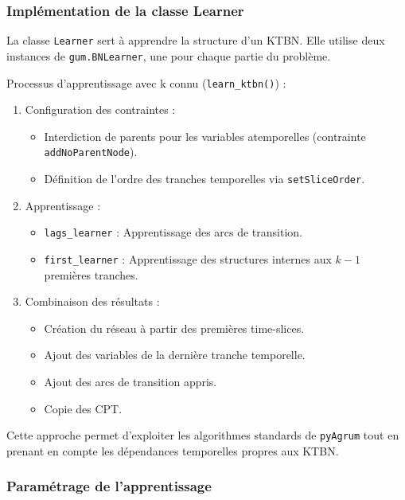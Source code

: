 \documentclass{article}
\begin{document}
\subsubsection{Implémentation de la classe Learner}

La classe \texttt{Learner} sert à apprendre la structure d'un KTBN. Elle utilise deux instances
de \texttt{gum.BNLearner}, une pour chaque partie du problème.

Processus d'apprentissage avec k connu (\texttt{learn\_ktbn()}) :

\begin{enumerate}
    \item Configuration des contraintes :
          \begin{itemize}
              \item Interdiction de parents pour les variables atemporelles (contrainte \texttt{addNoParentNode}).
              \item Définition de l'ordre des tranches temporelles via \texttt{setSliceOrder}.
          \end{itemize}
    \item Apprentissage :
          \begin{itemize}
              \item \texttt{lags\_learner} : Apprentissage des arcs de transition.
              \item \texttt{first\_learner} : Apprentissage des structures internes aux $k-1$ premières tranches.
          \end{itemize}
    \item Combinaison des résultats :
          \begin{itemize}
              \item Création du réseau à partir des premières time-slices.
              \item Ajout des variables de la dernière tranche temporelle.
              \item Ajout des arcs de transition appris.
              \item Copie des CPT.
          \end{itemize}
\end{enumerate}

Cette approche permet d'exploiter les algorithmes standards de \texttt{pyAgrum} tout en prenant en compte les
dépendances temporelles propres aux KTBN.

\subsubsection{Paramétrage de l’apprentissage}
\end{document}
